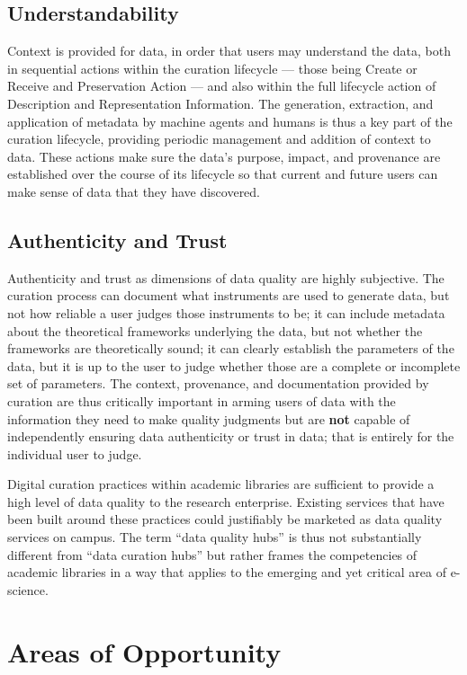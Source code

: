 \documentclass[man,12pt,biblatex]{apa6}
\begin{document}
\subsection{Understandability}

Context is provided for data, in order that users may understand the
data, both in sequential actions within the curation lifecycle ---
those being Create or Receive and Preservation Action --- and also
within the full lifecycle action of Description and Representation
Information. The generation, extraction, and application of metadata
by machine agents and humans is thus a key part of the curation
lifecycle, providing periodic management and addition of context to
data.  These actions make sure the data's purpose, impact, and
provenance are established over the course of its lifecycle so that
current and future users can make sense of data that they have
discovered.

\subsection{Authenticity and Trust}

Authenticity and trust as dimensions of data quality are highly
subjective.  The curation process can document what instruments are
used to generate data, but not how reliable a user judges those
instruments to be; it can include metadata about the theoretical
frameworks underlying the data, but not whether the frameworks are
theoretically sound; it can clearly establish the parameters of the
data, but it is up to the user to judge whether those are a complete
or incomplete set of parameters. The context, provenance, and
documentation provided by curation are thus critically important in
arming users of data with the information they need to make quality
judgments but are \textbf{not} capable of independently ensuring data
authenticity or trust in data; that is entirely for the individual
user to judge.

Digital curation practices within academic libraries are sufficient to
provide a high level of data quality to the research
enterprise. Existing services that have been built around these
practices could justifiably be marketed as data quality services on
campus. The term ``data quality hubs'' is thus not substantially
different from ``data curation hubs'' but rather frames the
competencies of academic libraries in a way that applies to the
emerging and yet critical area of e-science.

\section{Areas of Opportunity}
\end{document}
